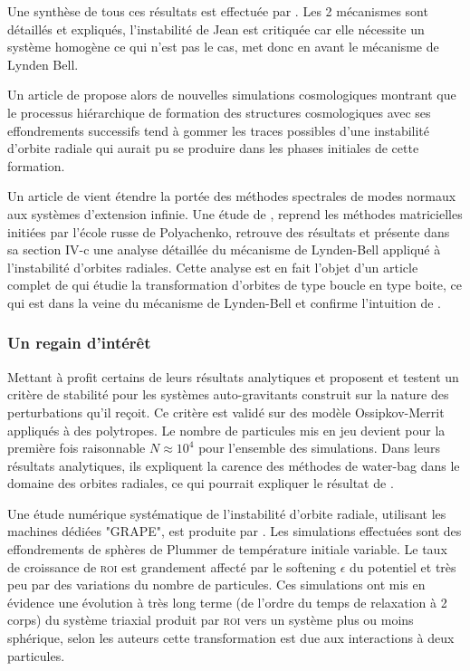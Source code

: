 Une synthèse de tous ces résultats est effectuée par \cite{merritt1987}. Les 2 mécanismes sont détaillés et expliqués, l'instabilité de Jean est
critiquée car elle nécessite un système homogène ce qui n'est pas le cas, \cite{merritt1987} met donc en avant le mécanisme de Lynden Bell.

Un article de \cite{katz} propose alors de nouvelles simulations cosmologiques montrant que le processus hiérarchique de
formation des structures cosmologiques avec ses effondrements successifs tend à gommer les traces possibles d'une instabilité d'orbite radiale qui
aurait pu se produire dans les phases initiales de cette formation.

Un article de \cite{saha} vient étendre la portée des méthodes spectrales de modes normaux aux systèmes d'extension
infinie.%
Une étude de \cite{weinberg}, reprend les méthodes matricielles initiées par l'école russe de Polyachenko, retrouve des résultats et présente dans sa
section IV-c une analyse détaillée du mécanisme de Lynden-Bell appliqué à l'instabilité d'orbites radiales. Cette analyse est en fait l'objet d'un
article complet de \cite{cincotta} qui étudie la transformation d'orbites de type boucle en type boite, ce qui est dans la veine du mécanisme de
Lynden-Bell et confirme l'intuition de \cite{merritt1987}.

\subsubsection{Un regain d'intérêt}


Mettant à profit certains de leurs résultats analytiques \cite{JPerez96} et \cite{perez_et_al} proposent et testent un critère de stabilité
pour les systèmes auto-gravitants construit sur la nature des perturbations qu'il reçoit. Ce critère est validé sur des modèle Ossipkov-Merrit
appliqués à des polytropes. Le nombre de particules mis en jeu devient pour la première fois raisonnable $N\approx10^{4}$ pour l'ensemble des
simulations. Dans leurs résultats analytiques, ils expliquent la carence des méthodes de water-bag dans le domaine des orbites radiales, ce qui
pourrait expliquer le résultat de \cite{waterbag}.

Une étude numérique systématique de l'instabilité d'orbite radiale, utilisant les machines dédiées "GRAPE", est produite par \cite{theis}. Les
simulations effectuées sont des effondrements de sphères de Plummer de température initiale variable. Le taux de croissance de \textsc{roi} est
grandement affecté par le softening $\epsilon$ du potentiel et très peu par des variations du nombre de particules. Ces simulations ont mis en
évidence une évolution à très long terme (de l'ordre du temps de relaxation à 2 corps) du système triaxial produit par \textsc{roi} vers un système
plus ou moins sphérique, selon les auteurs cette transformation est due aux interactions à deux particules.

